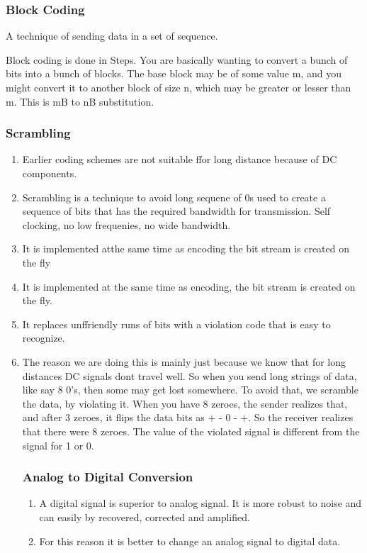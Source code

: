 \documentclass[11pt]{article}
\begin{document}
\subsubsection{Block Coding}
A technique of sending data in a set of sequence. 

Block coding is done in Steps. You are basically wanting to convert a bunch of bits into a bunch of blocks. The base block may be of some value m, and you might convert it to another block of size n, which may be greater or lesser than m. This is mB to nB substitution. 



\subsubsection{Scrambling}
\begin{enumerate}
	\item Earlier coding schemes are not suitable ffor long distance because of DC components. 
	\item Scrambling is a technique to avoid long sequene of 0s used to create a sequence of bits that has the required bandwidth for transmission. Self clocking, no low frequenies, no wide bandwidth. 
	\item It is implemented atthe same time as encoding the bit stream is created on the fly
	\item It is implemented at the same time as encoding, the bit stream is created on the fly. 
	\item It replaces unffriendly runs of bits with a violation code that is easy to recognize. 
	\item The reason we are doing this is mainly just because we know that for long distances DC signals dont travel well. So when you send long strings of data, like say 8 0's, then some may get lost somewhere. To avoid that, we scramble the data, by violating it. When you have 8 zeroes, the sender realizes that, and after 3 zeroes, it flips the data bits as + - 0 - +. So the receiver realizes that there were 8 zeroes. The value of the violated signal is different from the signal for 1 or 0. 
	

\subsubsection{Analog to Digital Conversion}
\begin{enumerate}
	\item A digital signal is superior to analog signal. It is more robust to noise and can easily by recovered, corrected and amplified. 
	\item For this reason it is better to change an analog signal to digital data.
\end{enumerate}


\end{enumerate}
\end{document}
